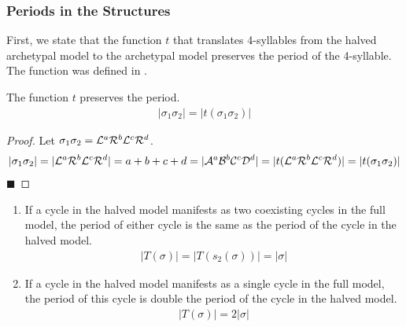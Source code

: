 \subsubsection{Periods in the  Structures}

First, we state that the function $t$ that translates 4-syllables from the halved archetypal model to the archetypal model preserves the period of the 4-syllable.
The function was defined in .

\begin{lemma}
	\label{lemma:t.preserves.period}
	The function $t$ preserves the period.
	\begin{align}
		|\sigma_1\sigma_2| = |t(\sigma_1\sigma_2)|
	\end{align}
\end{lemma}

\begin{proof}
	Let $\sigma_1\sigma_2 = \mathcal{L}^a\mathcal{R}^b\mathcal{L}^c\mathcal{R}^d$.
	\begin{align*}
		|\sigma_1\sigma_2| =  |\mathcal{L}^a\mathcal{R}^b\mathcal{L}^c\mathcal{R}^d|
		= a + b + c + d
		= |\mathcal{A}^a\mathcal{B}^b\mathcal{C}^c\mathcal{D}^d|
		= |t(\mathcal{L}^a\mathcal{R}^b\mathcal{L}^c\mathcal{R}^d)|
		= |t(\sigma_1\sigma_2)|
	\end{align*}
	\hfill $\blacksquare$
\end{proof}

\begin{theorem}
	\label{theorem:period.pal}
	\begin{enumerate}
		\item If a cycle in the halved model manifests as two coexisting cycles in the full model, the period of either cycle is the same as the period of the cycle in the halved model.
		      \begin{align*}
			      |T(\sigma)| = |T(s_2(\sigma))| = |\sigma|
		      \end{align*}
		\item If a cycle in the halved model manifests as a single cycle in the full model, the period of this cycle is double the period of the cycle in the halved model.
		      \begin{align*}
			      |T(\sigma)| = 2 |\sigma|
		      \end{align*}
	\end{enumerate}
\end{theorem}

\clearpage

